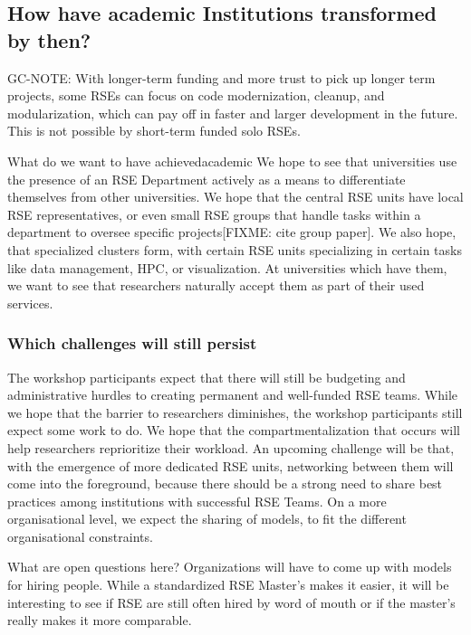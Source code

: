 \documentclass{eceasst}
\begin{document}
\subsection{How have academic Institutions transformed by then?}
GC-NOTE: With longer-term funding and more trust to pick up longer term projects,
some RSEs can focus on code modernization, cleanup, and modularization,
which can pay off in faster and larger development in the future.
This is not possible by short-term funded solo RSEs.

\begin{whatis}{What do we want to have achieved}{academic}
We hope to see that universities use the presence of an RSE Department actively as a means to differentiate themselves from other universities.
We hope that the central RSE units have local RSE representatives, or even small RSE groups that handle tasks within a department to oversee specific projects[FIXME: cite group paper].
We also hope, that specialized clusters form, with certain RSE units specializing in certain tasks like data management, HPC, or visualization.
At universities which have them, we want to see that researchers naturally accept them as part of their used services.
\end{whatis}

\subsubsection{Which challenges will still persist}
The workshop participants expect that there will still be budgeting and administrative hurdles to creating
permanent and well-funded RSE teams.
While we hope that the barrier to researchers diminishes, the workshop participants
still expect some work to do. We hope that the compartmentalization that occurs will help researchers reprioritize their workload.
An upcoming challenge will be that, with the emergence of more dedicated RSE units,
networking between them will come into the foreground, because there should be a strong need to share best practices
among institutions with successful RSE Teams.
On a more organisational level, we expect the sharing of models, to fit the different organisational constraints.

What are open questions here?
Organizations will have to come up with models for hiring people. While
a standardized RSE Master's makes it easier, it will be interesting to see if
RSE are still often hired by word of mouth or if the master's really makes it more comparable.
\end{document}
